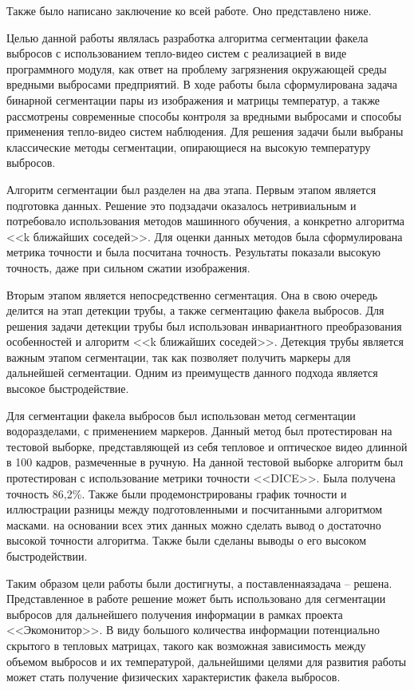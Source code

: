 \documentclass[14pt, a4paper]{extreport}
\begin{document}
	Также было написано заключение ко всей работе. Оно представлено ниже.
	
	Целью данной работы являлась разработка алгоритма сегментации факела выбросов с использованием тепло-видео систем с реализацией в виде программного модуля, как ответ на проблему загрязнения окружающей среды вредными выбросами предприятий. В ходе работы была сформулирована задача бинарной сегментации пары из изображения и матрицы температур, а также рассмотрены современные способы контроля за вредными выбросами и способы применения тепло-видео систем наблюдения. Для решения задачи были выбраны классические методы сегментации, опирающиеся на высокую температуру выбросов.
	
	Алгоритм сегментации был разделен на два этапа. Первым этапом является подготовка данных. Решение это подзадачи оказалось нетривиальным и потребовало использования методов машинного обучения, а конкретно алгоритма <<k ближайших соседей>>. Для оценки данных методов была сформулирована метрика точности и была посчитана точность. Результаты показали высокую точность, даже при сильном сжатии изображения.
	
	Вторым этапом является непосредственно сегментация. Она в свою очередь делится на этап детекции трубы, а также сегментацию факела выбросов. Для решения задачи детекции трубы был использован инвариантного преобразования особенностей и алгоритм <<k ближайших соседей>>. Детекция трубы является важным этапом сегментации, так как позволяет получить маркеры для дальнейшей сегментации. Одним из преимуществ данного подхода является высокое быстродействие.
	
	Для сегментации факела выбросов был использован метод сегментации водоразделами, с применением маркеров. Данный метод был протестирован на тестовой выборке, представляющей из себя тепловое и оптическое видео длинной в 100 кадров, размеченные в ручную. На данной тестовой выборке алгоритм был протестирован с использование метрики точности <<DICE>>. Была получена точность 86,2\%. Также были продемонстрированы график точности и иллюстрации разницы между подготовленными и посчитанными алгоритмом масками. на основании всех этих данных можно сделать вывод о достаточно высокой точности алгоритма. Также были сделаны выводы о его высоком быстродействии.
	
	Таким образом цели работы были достигнуты, а поставленная\linebreak задача -- решена. Представленное в работе решение может быть использовано для сегментации выбросов для дальнейшего получения информации в рамках проекта <<Экомонитор>>. В виду большого количества информации потенциально скрытого в тепловых матрицах, такого как возможная зависимость между объемом выбросов и их температурой, дальнейшими целями для развития работы может стать получение физических характеристик факела выбросов.
\end{document}

